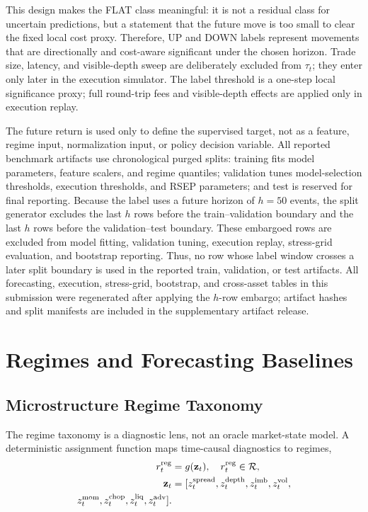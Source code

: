 \documentclass[conference]{IEEEtran}
\begin{document}
This design makes the FLAT class meaningful: it is not a residual class for uncertain predictions, but a statement that the future move is too small to clear the fixed local cost proxy. Therefore, UP and DOWN labels represent movements that are directionally and cost-aware significant under the chosen horizon. Trade size, latency, and visible-depth sweep are deliberately excluded from $\tau_t$; they enter only later in the execution simulator. The label threshold is a one-step local significance proxy; full round-trip fees and visible-depth effects are applied only in execution replay.

The future return is used only to define the supervised target, not as a feature, regime input, normalization input, or policy decision variable. All reported benchmark artifacts use chronological purged splits: training fits model parameters, feature scalers, and regime quantiles; validation tunes model-selection thresholds, execution thresholds, and RSEP parameters; and test is reserved for final reporting. Because the label uses a future horizon of $h=50$ events, the split generator excludes the last $h$ rows before the train--validation boundary and the last $h$ rows before the validation--test boundary. These embargoed rows are excluded from model fitting, validation tuning, execution replay, stress-grid evaluation, and bootstrap reporting. Thus, no row whose label window crosses a later split boundary is used in the reported train, validation, or test artifacts. All forecasting, execution, stress-grid, bootstrap, and cross-asset tables in this submission were regenerated after applying the $h$-row embargo; artifact hashes and split manifests are included in the supplementary artifact release.

\section{Regimes and Forecasting Baselines}
\subsection{Microstructure Regime Taxonomy}
The regime taxonomy is a diagnostic lens, not an oracle market-state model. A deterministic assignment function maps time-causal diagnostics to regimes,
\begin{equation}
\begin{split}
r^{\rm reg}_t &= g(\mathbf{z}_t),\quad r^{\rm reg}_t\in\mathcal{R},\\
\mathbf{z}_t &= [z^{\rm spread}_t,z^{\rm depth}_t,z^{\rm imb}_t,z^{\rm vol}_t,\\
 z^{\rm mom}_t,z^{\rm chop}_t,z^{\rm liq}_t,z^{\rm adv}_t].
\end{split}
\end{equation}
\end{document}
